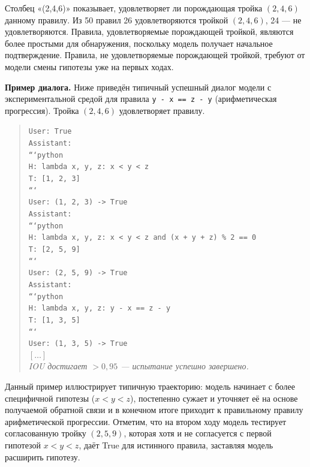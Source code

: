 Столбец «(2,4,6)» показывает, удовлетворяет ли порождающая тройка $(2, 4, 6)$ данному правилу. Из 50 правил 26 удовлетворяются тройкой $(2, 4, 6)$, 24 --- не удовлетворяются. Правила, удовлетворяемые порождающей тройкой, являются более простыми для обнаружения, поскольку модель получает начальное подтверждение. Правила, не удовлетворяемые порождающей тройкой, требуют от модели смены гипотезы уже на первых ходах.

\textbf{Пример диалога.} Ниже приведён типичный успешный диалог модели с экспериментальной средой для правила \texttt{y - x == z - y} (арифметическая прогрессия). Тройка $(2, 4, 6)$ удовлетворяет правилу.

\begin{quote}
\texttt{User: True}\\[2pt]
\texttt{Assistant:}\\
\texttt{```python}\\
\texttt{H: lambda x, y, z: x < y < z}\\
\texttt{T: [1, 2, 3]}\\
\texttt{```}\\[2pt]
\texttt{User: (1, 2, 3) -> True}\\[2pt]
\texttt{Assistant:}\\
\texttt{```python}\\
\texttt{H: lambda x, y, z: x < y < z and (x + y + z) \% 2 == 0}\\
\texttt{T: [2, 5, 9]}\\
\texttt{```}\\[2pt]
\texttt{User: (2, 5, 9) -> True}\\[2pt]
\texttt{Assistant:}\\
\texttt{```python}\\
\texttt{H: lambda x, y, z: y - x == z - y}\\
\texttt{T: [1, 3, 5]}\\
\texttt{```}\\[2pt]
\texttt{User: (1, 3, 5) -> True}\\[4pt]
$[\ldots]$\\[4pt]
\textit{IOU достигает $> 0{,}95$ --- испытание успешно завершено.}
\end{quote}

Данный пример иллюстрирует типичную траекторию: модель начинает с более специфичной гипотезы ($x < y < z$), постепенно сужает и уточняет её на основе получаемой обратной связи и в конечном итоге приходит к правильному правилу арифметической прогрессии. Отметим, что на втором ходу модель тестирует согласованную тройку $(2, 5, 9)$, которая хотя и не согласуется с первой гипотезой $x < y < z$, даёт True для истинного правила, заставляя модель расширить гипотезу.

